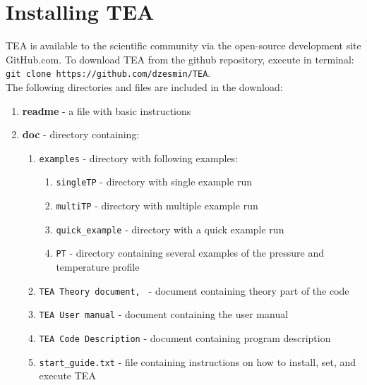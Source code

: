 \section{Installing TEA}
\label{InstallTEA}
TEA is available to the scientific community via the open-source
development site GitHub.com. To download TEA from the github
repository, execute in terminal: \\ \texttt{git clone
https://github.com/dzesmin/TEA}.\\

The following directories and files are included in the download:
{
\begin{enumerate}
\setlength\itemsep{0ex}
\setlength\topsep{0ex}
\setlength\partopsep{0ex}
\setlength\parsep{0ex}

\item {\bf readme} - a file with basic instructions

\item {\bf doc } - directory containing: 

\begin{enumerate}
\setlength\itemsep{0ex}
\setlength\topsep{0ex}
\setlength\partopsep{0ex}
\setlength\parsep{0ex}
\item \texttt{examples} - directory with following examples:
\begin{enumerate}
\setlength\itemsep{0ex}
\setlength\topsep{0ex}
\setlength\partopsep{0ex}
\setlength\parsep{0ex}
\item \texttt{singleTP} - directory with single  example run
\item \texttt{multiTP} - directory with multiple  example run
\item \texttt{quick\_example} - directory with a quick example run
\item \texttt{PT} - directory containing several examples of the
  pressure and temperature profile
\end{enumerate}
\item \texttt{TEA Theory document, \citet{BlecicEtal2015-TEAtheory}} - 
document containing \newline theory part of the code
\item \texttt{TEA User manual} - document containing the user manual
\item \texttt{TEA Code Description} - document containing program
  description
\item \texttt{start\_guide.txt} - file containing instructions on how to
  install, set, and execute TEA
\end{enumerate}


\end{enumerate}}
